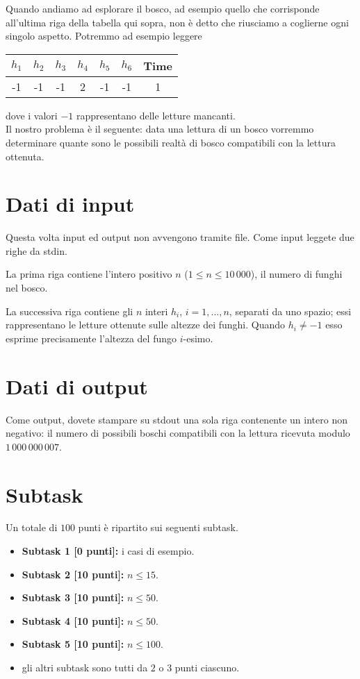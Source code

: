\documentclass[a4paper,11pt]{article}
\begin{document}
Quando andiamo ad esplorare il bosco, ad esempio quello che corrisponde all'ultima riga della tabella qui sopra, non \`e detto che riusciamo a coglierne ogni singolo aspetto.
Potremmo ad esempio leggere

\begin{table}[h!tb]  
\begin{tabular}{ cccccc|c }
  \hline
  $h_1$ & $h_2$ & $h_3$ & $h_4$ & $h_5$ & $h_6$ & {\sc Time}\\
  \hline
    -1  &  -1  &   -1  &    2  &   -1  &   -1 &      1    \\
  \hline
\end{tabular}
\end{table}  

dove i valori $-1$ rappresentano delle letture mancanti.\\

Il nostro problema \`e il seguente:
data una lettura di un bosco vorremmo determinare quante sono le possibili realt\`a di bosco compatibili con la lettura ottenuta.

\section*{Dati di input}
  
Questa volta input ed output non avvengono tramite file.
Come input leggete due righe da stdin.

La prima riga contiene l'intero positivo $n$ ($1\leq n \leq 10\,000$),
il numero di funghi nel bosco.

La successiva riga contiene gli $n$ interi $h_i$, $i=1,\ldots, n$,
separati da uno spazio; essi rappresentano le letture ottenute sulle altezze dei funghi. Quando $h_i\neq -1$ esso esprime precisamente l'altezza del fungo $i$-esimo.


\section*{Dati di output}
  Come output, dovete stampare su stdout una sola riga
contenente un intero non negativo: il numero di possibili boschi compatibili con la lettura ricevuta modulo $1\, 000\, 000\, 007$.

  
  \section*{Subtask}
  Un totale di $100$ punti \`e ripartito sui seguenti subtask.
  \begin{itemize}
    \item \textbf{Subtask 1 [0 punti]:} i casi di esempio.
    \item \textbf{Subtask 2 [10 punti]:} $n\leq 15$.
    \item \textbf{Subtask 3 [10 punti]:} $n\leq 50$.
    \item \textbf{Subtask 4 [10 punti]:} $n\leq 50$.
    \item \textbf{Subtask 5 [10 punti]:} $n\leq 100$.
    \item gli altri subtask sono tutti da $2$ o $3$ punti ciascuno.
  \end{itemize}
\end{document}
